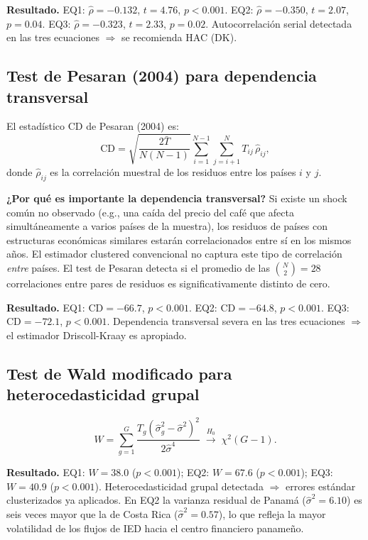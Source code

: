 \documentclass[12pt, a4paper]{article}
\theoremstyle{definition}
\begin{document}
\begin{resultbox}
\textbf{Resultado.} EQ1: $\hat\rho = -0.132$, $t = 4.76$, $p < 0.001$. EQ2: $\hat\rho = -0.350$, $t = 2.07$, $p = 0.04$. EQ3: $\hat\rho = -0.323$, $t = 2.33$, $p = 0.02$. Autocorrelación serial detectada en las tres ecuaciones $\Rightarrow$ se recomienda HAC (DK).
\end{resultbox}

\subsection{Test de Pesaran (2004) para dependencia transversal}

El estadístico CD de Pesaran (2004) es:
\[
  \mathrm{CD} = \sqrt{\frac{2\bar{T}}{N(N-1)}}\sum_{i=1}^{N-1}\sum_{j=i+1}^{N} T_{ij}\,\hat\rho_{ij},
\]
donde $\hat\rho_{ij}$ es la correlación muestral de los residuos entre los países $i$ y $j$.

\begin{intuitionbox}
\textbf{¿Por qué es importante la dependencia transversal?} Si existe un shock común no observado (e.g., una caída del precio del café que afecta simultáneamente a varios países de la muestra), los residuos de países con estructuras económicas similares estarán correlacionados entre sí en los mismos años. El estimador clustered convencional no captura este tipo de correlación \emph{entre} países. El test de Pesaran detecta si el promedio de las $\binom{N}{2} = 28$ correlaciones entre pares de residuos es significativamente distinto de cero.
\end{intuitionbox}

\begin{resultbox}
\textbf{Resultado.} EQ1: $\mathrm{CD} = -66.7$, $p < 0.001$. EQ2: $\mathrm{CD} = -64.8$, $p < 0.001$. EQ3: $\mathrm{CD} = -72.1$, $p < 0.001$. Dependencia transversal severa en las tres ecuaciones $\Rightarrow$ el estimador Driscoll-Kraay es apropiado.
\end{resultbox}

\subsection{Test de Wald modificado para heterocedasticidad grupal}

\[
  W = \sum_{g=1}^{G} \frac{T_g(\hat\sigma^2_g - \hat\sigma^2)^2}{2\hat\sigma^4} \;\xrightarrow{H_0}\; \chi^2(G-1).
\]

\begin{resultbox}
\textbf{Resultado.} EQ1: $W = 38.0$ ($p < 0.001$); EQ2: $W = 67.6$ ($p < 0.001$); EQ3: $W = 40.9$ ($p < 0.001$). Heterocedasticidad grupal detectada $\Rightarrow$ errores estándar clusterizados ya aplicados. En EQ2 la varianza residual de Panamá ($\hat\sigma^2 = 6.10$) es seis veces mayor que la de Costa Rica ($\hat\sigma^2 = 0.57$), lo que refleja la mayor volatilidad de los flujos de IED hacia el centro financiero panameño.
\end{resultbox}
\end{document}
